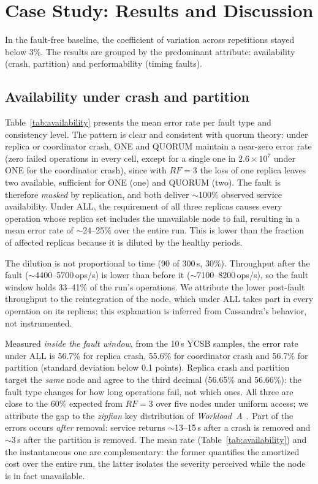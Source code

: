 \documentclass[runningheads]{llncs}
\begin{document}
\section{Case Study: Results and Discussion}
\label{sec:casestudy}

In the fault-free baseline, the coefficient of variation across repetitions
stayed below 3\%. The results are grouped by the predominant attribute:
availability (crash, partition) and performability (timing faults).

\subsection{Availability under crash and partition}

Table~\ref{tab:availability} presents the mean error rate per fault type and
consistency level. The pattern is clear and consistent with quorum theory: under
replica or coordinator crash, ONE and QUORUM maintain a near-zero error rate
(zero failed operations in every cell, except for a single one in
$2.6\times10^{7}$ under ONE for the coordinator crash), since with $RF=3$ the loss of
one replica leaves two available, sufficient for ONE (one) and QUORUM (two). The
fault is therefore \emph{masked} by replication, and both deliver $\sim$100\%
observed service availability. Under ALL, the requirement of all three replicas
causes every operation whose replica set includes the unavailable node to fail,
resulting in a mean error rate of $\sim$24--25\% over the entire run. This is lower than
the fraction of affected replicas because it is diluted by the healthy periods.

The dilution is not proportional to time (90 of 300\,s, 30\%). Throughput
after the fault ($\sim$4400--5700\,ops/s) is lower than before it
($\sim$7100--8200\,ops/s), so the fault window holds 33--41\% of the run's
operations. We attribute the lower post-fault throughput to the reintegration of
the node, which under ALL takes part in every operation on its replicas; this
explanation is inferred from Cassandra's behavior, not instrumented.

Measured \emph{inside the fault window}, from the 10\,s YCSB samples, the error
rate under ALL is 56.7\% for replica crash, 55.6\% for coordinator crash and
56.7\% for partition (standard deviation below 0.1 points). Replica crash and
partition target the \emph{same} node and agree to the third decimal (56.65\%
and 56.66\%): the fault type changes for how long operations fail, not which
ones. All three are close to the 60\% expected from $RF=3$ over five nodes under
uniform access; we attribute the gap to the \emph{zipfian} key distribution of
\emph{Workload~A}~\cite{ycsb}. Part of the errors occurs \emph{after} removal:
service returns $\sim$13--15\,s after a crash is removed and $\sim$3\,s after
the partition is removed. The mean rate (Table~\ref{tab:availability}) and the
instantaneous one are complementary: the former quantifies the amortized cost over
the entire run, the latter isolates the severity perceived while the node is in
fact unavailable.
\end{document}

